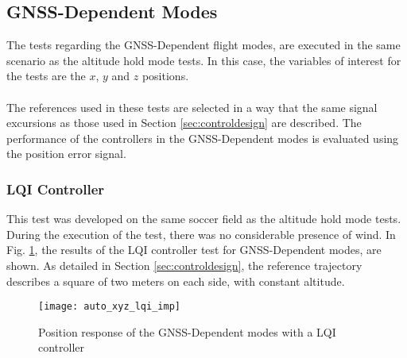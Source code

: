 \subsection{GNSS-Dependent Modes}
The tests regarding the GNSS-Dependent flight modes, are executed in the same scenario as the altitude hold mode tests. In this case, the variables of interest for the tests are the $ x $, $y $ and $ z $ positions.
\\\\
The references used in these tests are selected in a way that the same signal excursions as those used in Section \ref{sec:controldesign} are described. The performance of the controllers in the GNSS-Dependent modes is evaluated using the position error signal.

\subsubsection{LQI Controller}
This test was developed on the same soccer field as the altitude hold mode tests. During the execution of the test, there was no considerable presence of wind. In
Fig. \ref{fig:auto_xyz_lqi_imp}, the results of the LQI controller test for GNSS-Dependent modes, are shown. As detailed in Section \ref{sec:controldesign}, the reference trajectory describes a square of two meters on each side, with constant altitude.
\begin{figure}[h]
	\begin{center}
	\texttt{[image: auto\_xyz\_lqi\_imp]}
	\caption{Position response of the GNSS-Dependent modes with a LQI controller}
	\label{fig:auto_xyz_lqi_imp}
	\end{center}
	\end{figure}
	


